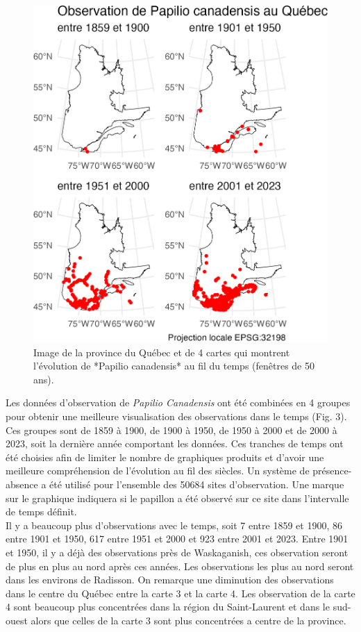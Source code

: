 \documentclass[9pt,twocolumn,twoside,]{pnas-new}
\begin{document}
\begin{figure}

\includegraphics[width=1\linewidth]{../Figures_analyse/cartes_pcanadensis} \hfill{}

\caption{Image de la province du Québec et de 4 cartes qui montrent l'évolution de *Papilio canadensis* au fil du temps (fenêtres de 50 ans).}\label{fig:fig_cartes_pcanadensis, fullpage-figure}
\end{figure}

Les données d'observation de \emph{Papilio Canadensis} ont été combinées
en 4 groupes pour obtenir une meilleure visualisation des observations
dans le temps (Fig. 3). Ces groupes sont de 1859 à 1900, de 1900 à 1950,
de 1950 à 2000 et de 2000 à 2023, soit la dernière année comportant les
données. Ces tranches de temps ont été choisies afin de limiter le
nombre de graphiques produits et d'avoir une meilleure compréhension de
l'évolution au fil des siècles. Un système de présence-absence a été
utilisé pour l'ensemble des 50684 sites d'observation. Une marque sur le
graphique indiquera si le papillon a été observé sur ce site dans
l'intervalle de temps définit.\\
Il y a beaucoup plus d'observations avec le temps, soit 7 entre 1859 et
1900, 86 entre 1901 et 1950, 617 entre 1951 et 2000 et 923 entre 2001 et
2023. Entre 1901 et 1950, il y a déjà des observations près de
Waskaganish, ces observation seront de plus en plus au nord après ces
années. Les observations les plus au nord seront dans les environs de
Radisson. On remarque une diminution des observations dans le centre du
Québec entre la carte 3 et la carte 4. Les observation de la carte 4
sont beaucoup plus concentrées dans la région du Saint-Laurent et dans
le sud-ouest alors que celles de la carte 3 sont plus concentrées a
centre de la province.
\end{document}
